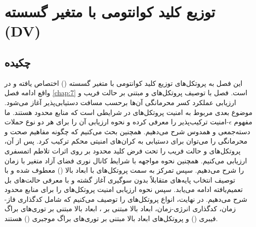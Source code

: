 
\chapter{توزیع کلید کوانتومی با متغیر گسسته (DV)}
\label{chap:8}

\section*{چکیده}
این فصل به پروتکل‌های توزیع کلید کوانتومی با متغیر گسسته () اختصاص یافته و در واقع ادامه فصل \ref{chap:7} است. فصل با توصیف پروتکل‌های  و مبتنی بر حالت فریب و ارزیابی عملکرد کسر محرمانگی آن‌ها برحسب مسافت دستیابی‌پذیر آغاز می‌شود. موضوع بعدی مربوط به امنیت پروتکل‌های  در شرایطی است که منابع محدود هستند. ما مفهوم $\epsilon$-امنیت ترکیب‌پذیر را معرفی کرده و نحوه ارزیابی آن را برای هر دو نوع حملات دسته‌جمعی و همدوس شرح می‌دهیم. همچنین بحث می‌کنیم که چگونه مفاهیم صحت و محرمانگی را می‌توان برای دستیابی به کران‌های امنیتی محکم ترکیب کرد. پس از آن، پروتکل‌های  و حالت فریب را تحت فرض کلید محدود بر روی اثرات تلاطم اتمسفری ارزیابی می‌کنیم. همچنین نحوه مواجهه با شرایط کانال نوری فضای آزاد متغیر با زمان را شرح می‌دهیم. سپس تمرکز به سمت پروتکل‌های  با ابعاد بالا () معطوف شده و با توصیف انتخاب پایه‌های متقابلاً بدون سوگیری آغاز گشته و با معرفی حالت‌های بل تعمیم‌یافته ادامه می‌یابد. سپس نحوه ارزیابی امنیت پروتکل‌های  را برای منابع محدود شرح می‌دهیم. در نهایت، انواع پروتکل‌های  را توصیف می‌کنیم که شامل کدگذاری فاز-زمان، کدگذاری انرژی-زمان،  ابعاد بالا مبتنی بر ،  ابعاد بالا مبتنی بر توری‌های براگ فیبری () و پروتکل‌های  ابعاد بالا مبتنی بر توری‌های براگ موجبری () هستند.







